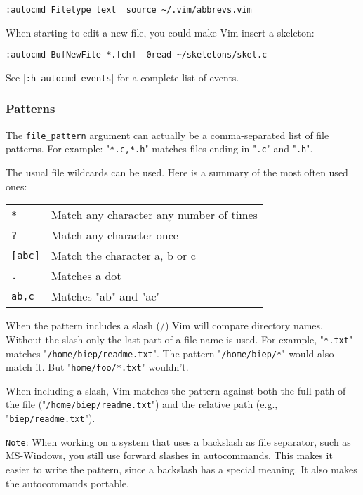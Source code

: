 {{\begin{Verbatim}[samepage=true]
 :autocmd Filetype text  source ~/.vim/abbrevs.vim
\end{Verbatim}

When starting to edit a new file, you could make Vim insert a skeleton:

\begin{Verbatim}[samepage=true]
 :autocmd BufNewFile *.[ch]  0read ~/skeletons/skel.c
\end{Verbatim}

See |\texttt{:h autocmd-events}| for a complete list of events.

\subsubsection{Patterns}
The \texttt{{file\_pattern}} argument can actually be a comma-separated list of file patterns.
For example: "\texttt{*.c,*.h}" matches files ending in "\texttt{.c}" and "\texttt{.h}".

The usual file wildcards can be used.
Here is a summary of the most often used ones:

\begin{center} \begin{tabular}{l l}
				\texttt{*} & Match any character any number of times \\
				\texttt{?} & Match any character once \\
				\texttt{[abc]} & Match the character a, b or c \\
				\texttt{.} & Matches a dot \\
				\texttt{a{b,c}} & Matches "ab" and "ac" \\
\end{tabular} \end{center}

When the pattern includes a slash (/) Vim will compare directory names.
Without the slash only the last part of a file name is used.
For example, "\texttt{*.txt}" matches "\texttt{/home/biep/readme.txt}".
The pattern "\texttt{/home/biep/*}" would also match it.
But "\texttt{home/foo/*.txt}" wouldn't.

When including a slash, Vim matches the pattern against both the full path of the file ("\texttt{/home/biep/readme.txt}") and the relative path (e.g., "\texttt{biep/readme.txt}").

\texttt{Note}: When working on a system that uses a backslash as file separator, such as MS-Windows, you still use forward slashes in autocommands.
This makes it easier to write the pattern, since a backslash has a special meaning.
It also makes the autocommands portable.

}}
